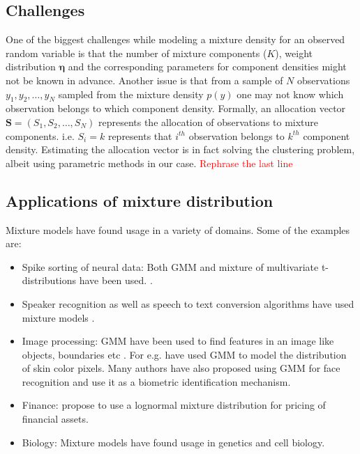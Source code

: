 \subsection{Challenges}
\label{subsec : challenges_mixture_density}
One of the biggest challenges while modeling a mixture density for an observed random variable is that the number of mixture components ($K$), weight distribution $\boldsymbol{\eta}$ and the corresponding parameters for component densities might not be known in advance. Another issue is that from a sample of $N$ observations $y_1, y_2, \ldots, y_N$ sampled from the mixture density $p(y)$ one may not know which observation belongs to which component density. Formally, an allocation vector $\boldsymbol{S} = (S_1, S_2, \ldots, S_N)$ represents the allocation of observations to mixture components. i.e. $S_i = k$ represents that $i^{th}$ observation belongs to $k^{th}$ component density. Estimating the allocation vector is in fact solving the clustering problem, albeit using parametric methods in our case. \textcolor{red}{Rephrase the last line}\\

\subsection{Applications of mixture distribution}
Mixture models have found usage in a variety of domains. Some of the examples are:
\begin{itemize}
\item Spike sorting of neural data: Both GMM and mixture of multivariate t-distributions have been used. \citep{lewicki_bayesian_1994,shoham_robust_2003}.
\item Speaker recognition as well as speech to text conversion algorithms have used mixture models \citep{simancas-acevedo_speaker_2001,xiang_efficient_2003,povey_subspace_2011}.
\item Image processing: GMM have been used to find features in an image like objects, boundaries etc \citep{fu_color_2012}. For e.g. \citet{ming-hsuan_yang_gaussian_1998} have used GMM to model the distribution of skin color pixels. Many authors have also proposed using GMM for face recognition and use it as a biometric identification mechanism.
\item Finance: \citet{brigo_lognormal-mixture_2002} propose to use a lognormal mixture distribution for pricing of financial assets.
\item Biology: Mixture models have found usage in genetics and cell biology.\citep{sim_evaluating_2012,gianola_mixture_2007} 
\end{itemize}

